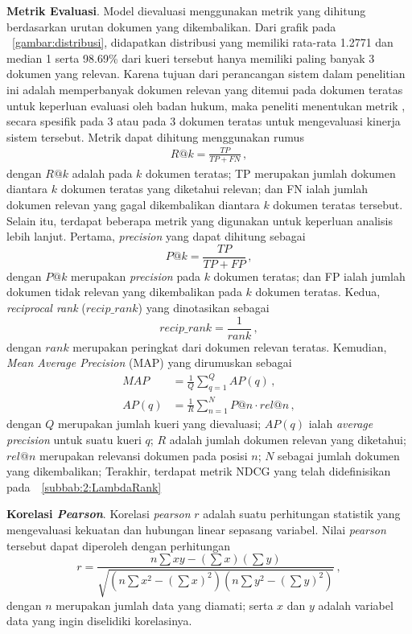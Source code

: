\vspace{2mm}
\noindent{}\textbf{Metrik Evaluasi}.
\label{bagian:Metrik Evaluasi}
Model dievaluasi menggunakan metrik yang dihitung berdasarkan urutan dokumen yang dikembalikan. Dari grafik pada \gambar{}~\ref{gambar:distribusi}, didapatkan distribusi yang memiliki rata-rata 1.2771 dan median 1 serta 98.69\% dari kueri tersebut hanya memiliki paling banyak 3 dokumen yang relevan. Karena tujuan dari perancangan sistem \ir{} dalam penelitian ini adalah memperbanyak dokumen relevan yang ditemui pada dokumen teratas untuk keperluan evaluasi oleh badan hukum, maka peneliti menentukan metrik \recall{}, secara spesifik pada \cutoff{} 3 atau pada 3 dokumen teratas untuk mengevaluasi kinerja sistem tersebut. Metrik \recall{} dapat dihitung menggunakan rumus
\begin{align*}
    R@k=\frac{TP}{TP+FN} \, ,
\end{align*}
dengan \(R@k\) adalah \recall{} pada \(k\) dokumen teratas; TP merupakan jumlah dokumen diantara $k$ dokumen teratas yang diketahui relevan; dan FN ialah jumlah dokumen relevan yang gagal dikembalikan diantara \(k\) dokumen teratas tersebut. Selain itu, terdapat beberapa metrik yang digunakan untuk keperluan analisis lebih lanjut. Pertama, \textit{precision} yang dapat dihitung sebagai
\[
P@k=\frac{TP}{TP+FP} \, ,
\]
dengan $P@k$ merupakan \textit{precision} pada $k$ dokumen teratas; dan FP ialah jumlah dokumen tidak relevan yang dikembalikan pada $k$ dokumen teratas. Kedua, \textit{reciprocal rank} ($recip\_rank$) yang dinotasikan sebagai
\[
recip\_rank=\frac{1}{rank} \, ,
\]
dengan $rank$ merupakan peringkat dari dokumen relevan teratas. Kemudian, \textit{Mean Average Precision} (MAP) yang dirumuskan sebagai
\begin{align*}
    MAP&=\frac{1}{Q} \sum_{q=1}^Q AP(q) \, ,\\
    AP(q)&=\frac{1}{R} \sum_{n=1}^N P@n \cdot rel@n \, ,
\end{align*}
dengan $Q$ merupakan jumlah kueri yang dievaluasi; $AP(q)$ ialah \textit{average precision} untuk suatu kueri $q$; $R$ adalah jumlah dokumen relevan yang diketahui; $rel@n$ merupakan relevansi dokumen pada posisi $n$; $N$ sebagai jumlah dokumen yang dikembalikan;  Terakhir, terdapat metrik NDCG yang telah didefinisikan pada~\subbab{}~\ref{subbab:2:LambdaRank}

\vspace{2mm}
\noindent{}\textbf{Korelasi \textit{Pearson}}.
\label{bagian:Korelasi Pearson}
Korelasi \textit{pearson} $r$ adalah suatu perhitungan statistik yang mengevaluasi kekuatan dan hubungan linear sepasang variabel. Nilai \textit{pearson} tersebut dapat diperoleh dengan perhitungan
\[
r=\frac{n\sum{}xy-(\sum{}x)(\sum{}y)}{\sqrt{(n\sum{}x^2-(\sum{}x)^2)(n\sum{}y^2-(\sum{}y)^2)}} \, ,
\]
dengan $n$ merupakan jumlah data yang diamati; serta $x$ dan $y$ adalah variabel data yang ingin diselidiki korelasinya.

